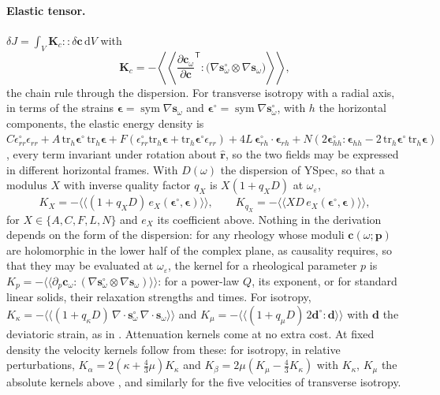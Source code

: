 \documentclass[11pt,a4paper]{article}
\newcommand{\bs}{\mathbf{s}}
\newcommand{\bc}{\mathbf{c}}
\newcommand{\br}{\hat{\mathbf{r}}}
\newcommand{\sd}{\mathbf{s}^\circ}
\newcommand{\sym}{\operatorname{sym}}
\newcommand{\dd}{\,\mathrm{d}}
\theoremstyle{remark}
\begin{document}
\paragraph{Elastic tensor.}
$\delta J = \int_V \mathbf{K}_c::\delta\bc\dd V$ with
\begin{equation}
  \mathbf{K}_c = -\left\langle\!\!\left\langle\frac{\partial\bc_\omega}
  {\partial\bc}^{\!\mathsf T}\!\!:\big(\nabla\sd_\omega\otimes\nabla
  \bs_\omega\big)\right\rangle\!\!\right\rangle,
\end{equation}
the chain rule through the dispersion. For transverse isotropy with a radial
axis, in terms of the strains $\bm\epsilon=\sym\nabla\bs_\omega$ and
$\bm\epsilon^\circ=\sym\nabla\sd_\omega$, with $h$ the horizontal
components, the elastic energy density is
$C\epsilon^\circ_{rr}\epsilon_{rr} + A\,\mathrm{tr}_h\bm\epsilon^\circ\,
\mathrm{tr}_h\bm\epsilon + F(\epsilon^\circ_{rr}\mathrm{tr}_h\bm\epsilon +
\mathrm{tr}_h\bm\epsilon^\circ\epsilon_{rr}) + 4L\,\bm\epsilon^\circ_{rh}
\cdot\bm\epsilon_{rh} + N(2\bm\epsilon^\circ_{hh}:\bm\epsilon_{hh} -
2\,\mathrm{tr}_h\bm\epsilon^\circ\,\mathrm{tr}_h\bm\epsilon)$, every term
invariant under rotation about $\br$, so the two fields may be expressed in
different horizontal frames. With $D(\omega)$ the dispersion of YSpec, so
that a modulus $X$ with inverse quality factor $q_X$ is $X(1+q_XD)$ at
$\omega_\varepsilon$,
\begin{equation}
  K_X = -\langle\!\langle(1+q_XD)\,e_X(\bm\epsilon^\circ,\bm\epsilon)
  \rangle\!\rangle, \qquad
  K_{q_X} = -\langle\!\langle X D\,e_X(\bm\epsilon^\circ,\bm\epsilon)
  \rangle\!\rangle,
\end{equation}
for $X\in\{A,C,F,L,N\}$ and $e_X$ its coefficient above. Nothing in the
derivation depends on the form of the dispersion: for any rheology whose
moduli $\bc(\omega;\mathbf{p})$ are holomorphic in the lower half of the
complex plane, as causality requires, so that they may be evaluated at
$\omega_\varepsilon$, the kernel for a rheological parameter $p$ is
$K_p = -\langle\!\langle\partial_p\bc_\omega:(\nabla\sd_\omega\otimes
\nabla\bs_\omega)\rangle\!\rangle$: for a power-law $Q$, its exponent, or for
standard linear solids, their relaxation strengths and times. For isotropy,
$K_\kappa = -\langle\!\langle(1+q_\kappa D)\,\nabla\cdot\sd_\omega\,
\nabla\cdot\bs_\omega\rangle\!\rangle$ and $K_\mu = -\langle\!\langle
(1+q_\mu D)\,2\mathbf{d}^\circ:\mathbf{d}\rangle\!\rangle$ with $\mathbf{d}$
the deviatoric strain, as in \citet[][eqs~63--64]{LiuTromp2008}.
Attenuation kernels come at no extra cost. At fixed density the velocity
kernels follow from these: for isotropy, in relative perturbations,
$K_\alpha = 2(\kappa+\tfrac43\mu)K_\kappa$ and $K_\beta = 2\mu(K_\mu -
\tfrac43K_\kappa)$ with $K_\kappa$, $K_\mu$ the absolute kernels above
\citep[cf.][eq.~68]{LiuTromp2008}, and similarly for the five velocities of
transverse isotropy.
\end{document}
